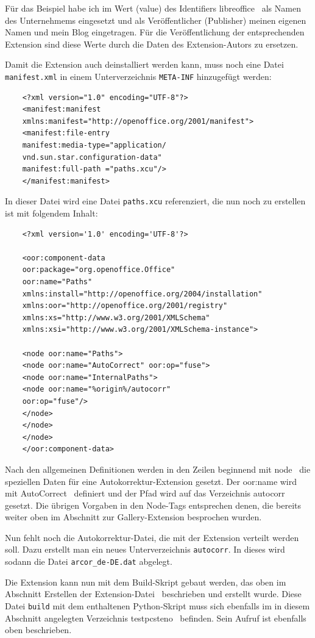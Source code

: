 \documentclass[12pt,a4paper,titlepage]{book}
\begin{document}
Für das Beispiel habe ich im Wert (value) des Identifiers \glqq libreoffice\grqq~ als Namen des Unternehmems eingesetzt und als Veröffentlicher (Publisher) meinen eigenen Namen und mein Blog eingetragen. Für die Veröffentlichung der entsprechenden Extension sind diese Werte durch die Daten des Extension-Autors zu ersetzen.

Damit die Extension auch deinstalliert werden kann, muss noch eine Datei \verb|manifest.xml| in einem Unterverzeichnis \verb|META-INF| hinzugefügt werden:
\begin{lstlisting}
	<?xml version="1.0" encoding="UTF-8"?>
	<manifest:manifest 
	xmlns:manifest="http://openoffice.org/2001/manifest">
	<manifest:file-entry
	manifest:media-type="application/
	vnd.sun.star.configuration-data" 
	manifest:full-path ="paths.xcu"/>
	</manifest:manifest>
\end{lstlisting}

In dieser Datei wird eine Datei \verb|paths.xcu| referenziert, die nun noch zu erstellen ist mit folgendem Inhalt:

\begin{lstlisting}
	<?xml version='1.0' encoding='UTF-8'?>
	
	<oor:component-data 
	oor:package="org.openoffice.Office" 
	oor:name="Paths" 
	xmlns:install="http://openoffice.org/2004/installation" 
	xmlns:oor="http://openoffice.org/2001/registry" 
	xmlns:xs="http://www.w3.org/2001/XMLSchema" 
	xmlns:xsi="http://www.w3.org/2001/XMLSchema-instance">
	
	<node oor:name="Paths">
	<node oor:name="AutoCorrect" oor:op="fuse">
	<node oor:name="InternalPaths">
	<node oor:name="%origin%/autocorr" 
	oor:op="fuse"/>
	</node>
	</node>
	</node>
	</oor:component-data>
\end{lstlisting}

Nach den allgemeinen Definitionen werden in den Zeilen beginnend mit \glqq node\grqq~ die speziellen Daten für eine Autokorrektur-Extension gesetzt. Der oor:name wird mit \glqq AutoCorrect\grqq~ definiert und der Pfad wird auf das Verzeichnis \glqq autocorr\grqq~ gesetzt. Die übrigen Vorgaben in den Node-Tags entsprechen denen, die bereits weiter oben im Abschnitt zur Gallery-Extension besprochen wurden.

Nun fehlt noch die Autokorrektur-Datei, die mit der Extension verteilt werden soll. Dazu erstellt man ein neues Unterverzeichnis \verb|autocorr|. In dieses wird sodann die Datei \verb|arcor_de-DE.dat| abgelegt.

Die Extension kann nun mit dem Build-Skript gebaut werden, das oben im Abschnitt \glqq Erstellen der Extension-Datei\grqq~ beschrieben und erstellt wurde. Diese Datei \verb|build| mit dem enthaltenen Python-Skript muss sich ebenfalls im in diesem Abschnitt angelegten Verzeichnis \glqq testpcsteno\grqq~ befinden. Sein Aufruf ist ebenfalls oben beschrieben.
\end{document}
